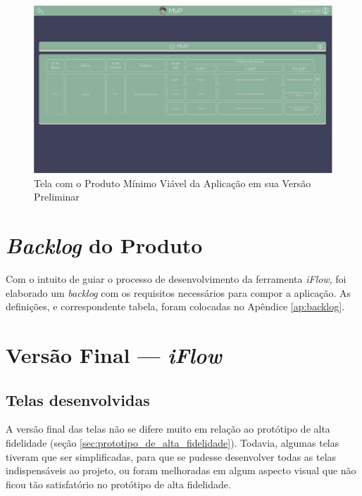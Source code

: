 \begin{itemize}
\begin{figure}[H]
      \begin{center}
          \caption{{Tela com o Produto Mínimo Viável da Aplicação em sua Versão Preliminar}}
          \label{fig:mvp}
          \includegraphics[scale=0.3]{figuras/Prototipo/mvp.png}
    \end{center}
    \end{figure}
\end{itemize}

\section{\textit{Backlog} do Produto}

\label{sec:backlog_do_produto}

Com o intuito de guiar o processo de desenvolvimento da ferramenta \textit{iFlow}, foi elaborado um \textit{backlog} com os requisitos necessários para compor a aplicação. As definições, e correspondente tabela, foram colocadas no Apêndice \ref{ap:backlog}.

\section{Versão Final — \textit{iFlow}}
\label{sec:versao_final_iFlow}

\subsection{Telas desenvolvidas}

A versão final das telas não se difere muito em relação ao protótipo de alta fidelidade (seção \ref{sec:prototipo_de_alta_fidelidade}). Todavia, algumas telas tiveram que ser simplificadas, para que se pudesse desenvolver todas as telas indispensáveis ao projeto, ou foram melhoradas em algum aspecto visual que não ficou tão satisfatório no protótipo de alta fidelidade.

